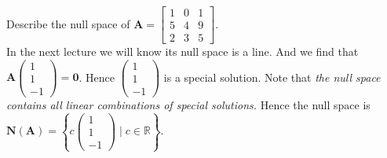 \begin{example}
Describe the null space of $\bm A = \begin{bmatrix}
1&0&1\\5&4&9\\2&3&5
\end{bmatrix}.$\\
In the next lecture we will know its null space is a line. And we find that $\bm A\begin{pmatrix}
1\\1\\-1
\end{pmatrix}= \bm 0$. Hence $\begin{pmatrix}
1\\1\\-1
\end{pmatrix}$ is a special solution. Note that \textit{the null space contains all linear combinations of special solutions.} Hence the null space is $\bm N(\bm A) = \left\{c\begin{pmatrix}
1\\1\\-1
\end{pmatrix}\mid c\in\mathbb{R}\right\}$.
\end{example}
